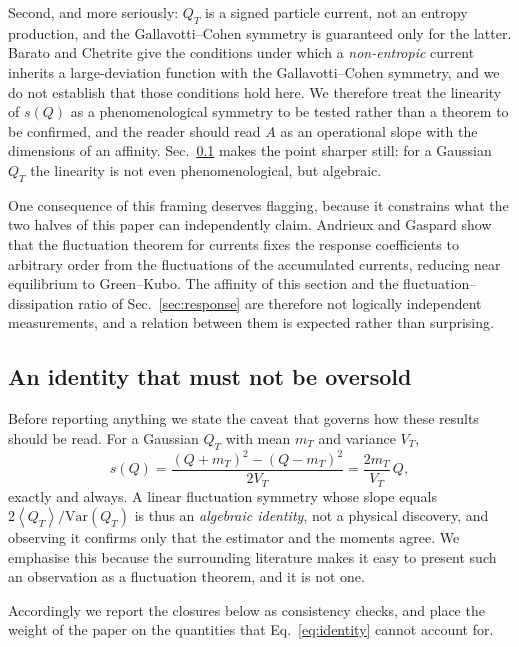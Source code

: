 \documentclass[aps,pre,twocolumn,superscriptaddress,floatfix,nofootinbib]{revtex4-2}
\newcommand{\avg}[1]{\left\langle #1 \right\rangle}
\newcommand{\Var}{\mathrm{Var}}
\begin{document}
Second, and more seriously: $Q_T$ is a signed particle current, not an entropy
production, and the Gallavotti--Cohen symmetry is guaranteed only for the
latter. Barato and Chetrite \cite{barato2012} give the conditions under which a
\emph{non-entropic} current inherits a large-deviation function with the
Gallavotti--Cohen symmetry, and we do not establish that those conditions hold
here. We therefore treat the linearity of $s(Q)$ as a phenomenological
symmetry to be tested rather than a theorem to be confirmed, and the reader
should read $A$ as an operational slope with the dimensions of an affinity.
Sec.~\ref{sec:identity} makes the point sharper still: for a Gaussian $Q_T$
the linearity is not even phenomenological, but algebraic.

One consequence of this framing deserves flagging, because it constrains what
the two halves of this paper can independently claim. Andrieux and Gaspard
\cite{andrieux2007jstat} show that the fluctuation theorem for currents fixes
the response coefficients to arbitrary order from the fluctuations of the
accumulated currents, reducing near equilibrium to Green--Kubo. The affinity
of this section and the fluctuation--dissipation ratio of
Sec.~\ref{sec:response} are therefore not logically independent measurements,
and a relation between them is expected rather than surprising.

\subsection{An identity that must not be oversold}
\label{sec:identity}

Before reporting anything we state the caveat that governs how these results
should be read. For a Gaussian $Q_T$ with mean $m_T$ and variance $V_T$,
\begin{equation}
  s(Q) = \frac{(Q+m_T)^2-(Q-m_T)^2}{2V_T} = \frac{2m_T}{V_T}\,Q ,
  \label{eq:identity}
\end{equation}
exactly and always. A linear fluctuation symmetry whose slope equals
$2\avg{Q_T}/\Var(Q_T)$ is thus an \emph{algebraic identity}, not a physical
discovery, and observing it confirms only that the estimator and the moments
agree. We emphasise this because the surrounding literature makes it easy to
present such an observation as a fluctuation theorem, and it is not one.

Accordingly we report the closures below as consistency checks, and place the
weight of the paper on the quantities that Eq.~\eqref{eq:identity} cannot
account for.
\end{document}
